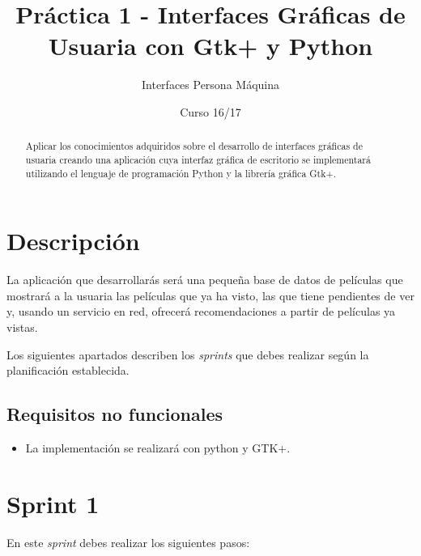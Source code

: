 \documentclass[11pt,a4paper]{article}
\title{Práctica 1 - Interfaces Gráficas de Usuaria con Gtk+ y Python}
\author{Interfaces Persona Máquina}
\date{Curso 16/17}
\begin{document}
\maketitle

\begin{abstract}
  Aplicar los conocimientos adquiridos sobre el desarrollo de
  interfaces gráficas de usuaria creando una aplicación cuya interfaz
  gráfica de escritorio se implementará utilizando el lenguaje de
  programación Python y la librería gráfica Gtk+.
\end{abstract}


\section{Descripción}

La aplicación que desarrollarás será una pequeña base de datos de películas
que mostrará a la usuaria las películas que ya ha visto, las que tiene
pendientes de ver y, usando un servicio en red, ofrecerá recomendaciones
a partir de películas ya vistas.

Los siguientes apartados describen los \emph{sprints} que debes
realizar según la planificación establecida.


\subsection{Requisitos no funcionales}
\begin{itemize}
\item La implementación se realizará con python y GTK+.
\end{itemize}


\section{Sprint 1}

En este \emph{sprint} debes realizar los siguientes pasos:
\end{document}
